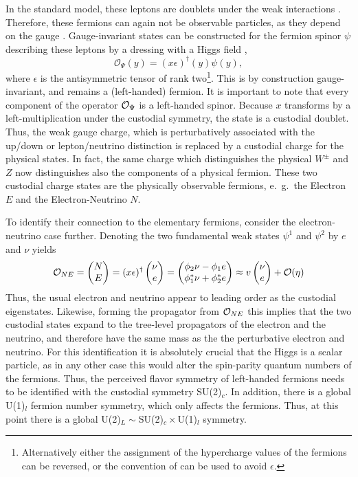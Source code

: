 \documentclass[final,12pt,3p,longtitle]{elsarticle}
\newcommand*{\no}{\noindent}
\newcommand*{\be}{\begin{equation}}
\newcommand*{\ee}{\end{equation}}
\newcommand*{\1}{1\!\!\!\bot}
\newcommand*{\bma}{\begin{matrix}}
\newcommand*{\ema}{\end{matrix}}
\newcommand*{\bpm}{\left(\bma}
\newcommand*{\epm}{\ema\right)}
\newcommand*{\op}{{\cal O}}
\begin{document}
In the standard model, these leptons are doublets under the weak interactions \cite{Bohm:2001yx}. Therefore, these fermions can again not be observable particles, as they depend on the gauge \cite{Frohlich:1980gj,Frohlich:1981yi}. Gauge-invariant states can be constructed for the fermion spinor $\psi$ describing these leptons by a dressing with a Higgs field \cite{Frohlich:1980gj,Frohlich:1981yi,Egger:2017tkd},
\be
\mathcal{O}_\Psi(y)= (x\epsilon)^{\dagger}(y)\psi(y)\label{opferm},
\ee
\no where $\epsilon$ is the antisymmetric tensor of rank two\footnote{Alternatively either the assignment of the hypercharge values of the fermions can be reversed, or the convention of \cite{Egger:2017tkd} can be used to avoid $\epsilon$.}. This is by construction gauge-invariant, and remains a (left-handed) fermion. It is important to note that every component of the operator $\op_\Psi$ is a left-handed spinor. Because $x$ transforms by a left-multiplication under the custodial symmetry, the state is a custodial doublet. Thus, the weak gauge charge, which is perturbatively associated with the up/down or lepton/neutrino distinction \cite{Bohm:2001yx} is replaced by a custodial charge for the physical states. In fact, the same charge which distinguishes the physical $W^\pm$ and $Z$ now distinguishes also the components of a physical fermion. These two custodial charge states are the physically observable fermions, e.\ g.\ the Electron $E$ and the Electron-Neutrino $N$.

To identify their connection to the elementary fermions, consider the electron-neutrino case further. Denoting the two fundamental weak states $\psi^1$ and $\psi^2$ by $e$ and $\nu$ yields \cite{Frohlich:1980gj,Frohlich:1981yi,Egger:2017tkd}
\be
\mathcal{O}_{NE}=\bpm N\cr E\epm=(x\epsilon)^\dagger \bpm \nu \\ e \epm = \bpm \phi_2 \nu  -  \phi_1 e  \\  \phi_1^* \nu + \phi_2^* e  \epm\approx v\bpm \nu\cr e\epm+{\cal O}(\eta)\label{opfermexp}
\ee
\no Thus, the usual electron and neutrino appear to leading order as the custodial eigenstates. Likewise, forming the propagator from $\op_{NE}$ this implies that the two custodial states expand to the tree-level propagators of the electron and the neutrino, and therefore have the same mass as the the perturbative electron and neutrino. For this identification it is absolutely crucial that the Higgs is a scalar particle, as in any other case this would alter the spin-parity quantum numbers of the fermions. Thus, the perceived flavor symmetry of left-handed fermions needs to be identified with the custodial symmetry SU(2)$_c$. In addition, there is a global U(1)$_l$ fermion number symmetry, which only affects the fermions. Thus, at this point there is a global U(2)$_L\sim$SU(2)$_c\times$U(1)$_l$ symmetry.
\end{document}
